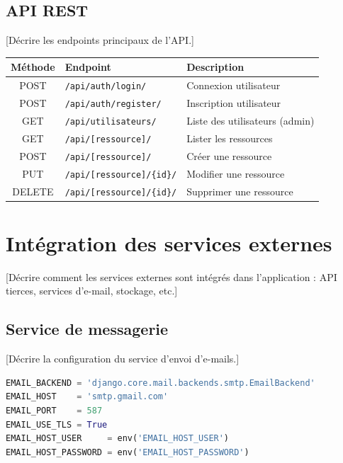 \documentclass[12pt, a4paper]{article}
\begin{document}
\subsection{API REST}

[Décrire les endpoints principaux de l'API.]

\begin{center}
\begin{tabular}{|c|L{4cm}|L{5cm}|}
  \hline
  \color{white}\textbf{Méthode} &
  \color{white}\textbf{Endpoint} &
  \color{white}\textbf{Description} \\
  \hline
  POST & \texttt{/api/auth/login/}     & Connexion utilisateur \\
  \hline
  POST & \texttt{/api/auth/register/}  & Inscription utilisateur \\
  \hline
  GET  & \texttt{/api/utilisateurs/}   & Liste des utilisateurs (admin) \\
  \hline
  GET  & \texttt{/api/[ressource]/}    & Lister les ressources \\
  \hline
  POST & \texttt{/api/[ressource]/}    & Créer une ressource \\
  \hline
  PUT  & \texttt{/api/[ressource]/\{id\}/} & Modifier une ressource \\
  \hline
  DELETE & \texttt{/api/[ressource]/\{id\}/} & Supprimer une ressource \\
  \hline
\end{tabular}
\end{center}

\section{Intégration des services externes}

[Décrire comment les services externes sont intégrés dans l'application :
API tierces, services d'e-mail, stockage, etc.]

\subsection{Service de messagerie}

[Décrire la configuration du service d'envoi d'e-mails.]

\begin{lstlisting}[language=Python, caption=Configuration e-mail (settings.py)]
EMAIL_BACKEND = 'django.core.mail.backends.smtp.EmailBackend'
EMAIL_HOST    = 'smtp.gmail.com'
EMAIL_PORT    = 587
EMAIL_USE_TLS = True
EMAIL_HOST_USER     = env('EMAIL_HOST_USER')
EMAIL_HOST_PASSWORD = env('EMAIL_HOST_PASSWORD')
\end{lstlisting}
\end{document}

